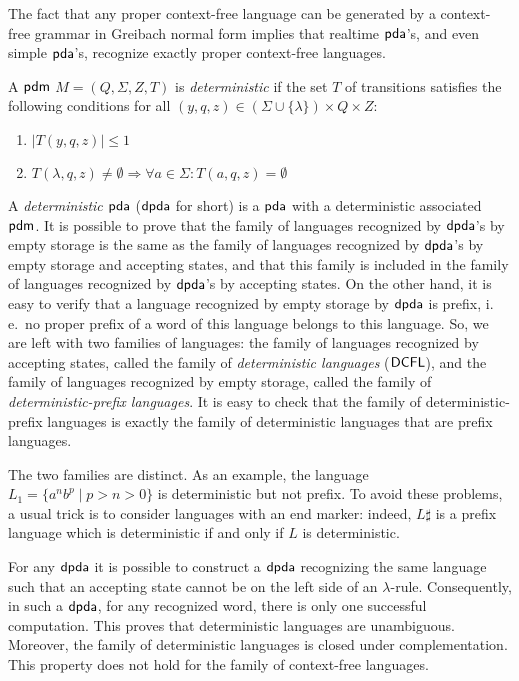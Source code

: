 The fact that any proper context-free language can be generated by a context-free grammar in Greibach normal form implies that realtime $\textup{\sf pda}$'s, and even simple $\textup{\sf pda}$'s, recognize exactly proper context-free languages.

A $\textup{\sf pdm}$ $M = (Q, \Sigma, Z, T)$ is \emph{deterministic} if the set $T$ of transitions satisfies the following conditions for all $(y, q, z) \in (\Sigma \cup \{\lambda\}) \times Q \times Z$:

\begin{enumerate}
\item $|T(y, q, z)| \le 1$
\item $T(\lambda, q, z) \neq \emptyset \Rightarrow \forall a \in \Sigma: T(a, q, z) = \emptyset$
\end{enumerate}

A \emph{deterministic $\textup{\sf pda}$} \index{$\dpda$}($\dpda$ for short) is a $\textup{\sf pda}$ with a deterministic associated $\textup{\sf pdm}$. It is possible to prove that the family of languages recognized by $\dpda$'s by empty storage is the same as the family of languages recognized by $\dpda$'s by empty storage and accepting states, and that this family is included in the family of languages recognized by $\dpda$'s by accepting states. On the other hand, it is easy to verify that a language recognized by empty storage by $\dpda$ is prefix, i.\,e.\ no proper prefix of a word of this language belongs to this language. So, we are left with two families of languages: the family of languages recognized by accepting states, called the family of \emph{deterministic languages} \index{$\DCFL$}($\DCFL$), and the family of languages recognized by empty storage, called the family of  \emph{deterministic-prefix languages}. It is easy to check that the family of deterministic-prefix languages is exactly the family of deterministic languages that are prefix languages.

The two families are distinct. As an example, the language $L_1 = \{a^n b^p \mid p > n > 0\}$ is deterministic but not prefix. To avoid these problems, a usual trick is to consider languages with an end marker: indeed, $L \sharp$ is a prefix language which is deterministic if and only if $L$ is deterministic.

For any $\dpda$ it is possible to construct a $\dpda$ recognizing the same language such that an accepting state cannot be on the left side of an $\lambda$-rule. Consequently, in such a $\dpda$, for any recognized word, there is only one successful computation. This proves that deterministic languages are unambiguous. Moreover, the family of deterministic languages is closed under complementation. This property does not hold for the family of context-free languages.


